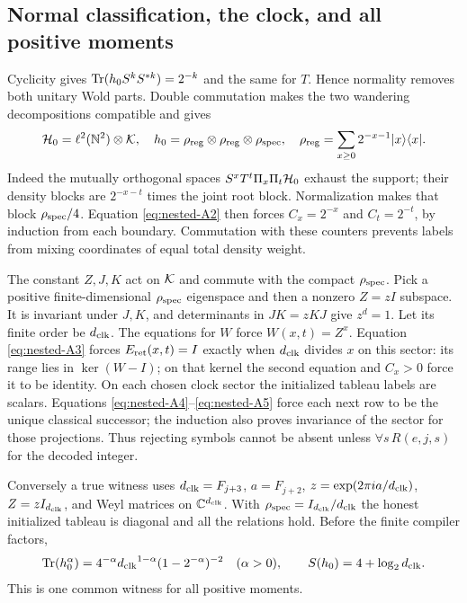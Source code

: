 \subsection{Normal classification, the clock, and all positive moments}
Cyclicity gives $\operatorname{Tr}(h_0S^kS^{*k})=2^{-k}$ and the same for $T$.
Hence normality removes both unitary Wold parts. Double commutation
makes the two wandering decompositions compatible and gives
\begin{equation}
 \mathcal H_0=\ell^2(\mathbb N^2)\otimes\mathcal K,\quad
 h_0=\rho_{\rm reg}\otimes\rho_{\rm reg}\otimes\rho_{\rm spec},\quad
 \rho_{\rm reg}=\sum_{x\ge0}2^{-x-1}|x\rangle\langle x|.                \label{eq:nested-A6}
\end{equation}
Indeed the mutually orthogonal spaces $S^xT^t\Pi_x\Pi_t\mathcal H_0$ exhaust the
support; their density blocks are $2^{-x-t}$ times the joint root block.
Normalization makes that block $\rho_{\rm spec}/4$. Equation \eqref{eq:nested-A2} then forces
$C_x=2^{-x}$ and $C_t=2^{-t}$, by induction from each boundary.
Commutation with these counters prevents labels from mixing coordinates
of equal total density weight.

The constant $Z,J,K$ act on $\mathcal K$ and commute with the compact
$\rho_{\rm spec}$. Pick a positive finite-dimensional $\rho_{\rm spec}$ eigenspace and
then a nonzero $Z=zI$ subspace. It is invariant under $J,K$, and
determinants in $JK=zKJ$ give $z^d=1$. Let its finite order be ${d_{\rm clk}}$.
The equations for $W$ force $W(x,t)=Z^x$. Equation \eqref{eq:nested-A3} forces
$E_{\rm ret}(x,t)=I$ exactly when ${d_{\rm clk}}$ divides $x$ on this sector:
its range lies in $\ker(W-I)$; on that kernel the second equation
and $C_x>0$ force it to be identity. On each chosen clock sector the initialized tableau labels
are scalars. Equations \eqref{eq:nested-A4}--\eqref{eq:nested-A5} force each next row to be the unique
classical successor; the induction also proves invariance of the
sector for those projections. Thus rejecting symbols cannot be absent
unless $\forall s\,R(e,j,s)$ for the decoded integer.

Conversely a true witness uses ${d_{\rm clk}}=F_{j+3}$, $a=F_{j+2}$,
$z=\exp(2\pi ia/{d_{\rm clk}})$, $Z=zI_{d_{\rm clk}}$, and Weyl matrices on $\mathbb C^{d_{\rm clk}}$.
With $\rho_{\rm spec}=I_{d_{\rm clk}}/{d_{\rm clk}}$ the honest initialized tableau is diagonal and
all the relations hold. Before the finite compiler factors,
\begin{equation}
 \operatorname{Tr}(h_0^\alpha)=4^{-\alpha}{d_{\rm clk}}^{1-\alpha}(1-2^{-\alpha})^{-2}
 \quad(\alpha>0),\qquad S(h_0)=4+\log_2{d_{\rm clk}}.                    \label{eq:nested-A7}
\end{equation}
This is one common witness for all positive moments.

